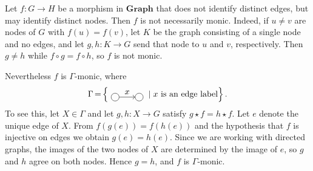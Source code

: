 \begin{example}
 
 Let \(f\mathop{\colon} G \mathop{\to} H\) be a morphism in \(\mathbf{Graph}\) that does not identify distinct edges, but may identify distinct nodes. Then \(f\) is not necessarily monic. Indeed, if \(u\mathop{\neq} v\) are nodes of \(G\) with \(f(u)=f(v)\), let \(K\) be the graph consisting of a single node and no edges, and let \(g,h\mathop{\colon} K \mathop{\to} G\) send that node to \(u\) and \(v\), respectively. Then \(g\mathop{\neq} h\) while \(f\circ g=f\circ h\), so \(f\) is not monic.

Nevertheless \(f\) is \(\Gamma\)-monic, where
\[
\Gamma \mathop{=} \left\{ \vcenter{\hbox{
\begin{tikzpicture}[baseline=-0.5ex]
\node[draw,circle] (A) at (0,0) {};
\node[draw,circle] (B) at (1,0) {};
\draw[->] (A) -- (B) node[midway, above] {$x$};
\end{tikzpicture}
}} \mid x \text{ is an edge label} \right\}.
\]
To see this, let \(X\in\Gamma\) and let \(g,h\mathop{\colon} X \mathop{\to} G\) satisfy \(g \mathop{\star} f \mathop{=} h \mathop{\star} f\). Let \(e\) denote the unique edge of \(X\). From \(f(g(e))\mathop{=}f(h(e))\) and the hypothesis that \(f\) is injective on edges we obtain \(g(e)\mathop{=}h(e)\). Since we are working with directed graphs, the images of the two nodes of \(X\) are determined by the image of \(e\), so \(g\) and \(h\) agree on both nodes. Hence \(g \mathop{=} h\), and \(f\) is \(\Gamma\)-monic.

\end{example}
